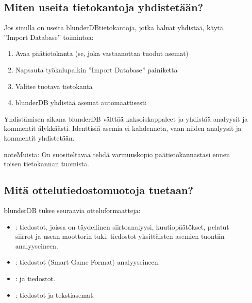 \documentclass[letterpaper,10pt,finnish]{sphinxmanual}
\begin{document}
\subsection{Miten useita tietokantoja yhdistetään?}
\label{\detokenize{faq:comment-fusionner-plusieurs-bases-de-donnees}}
\sphinxAtStartPar
Jos sinulla on useita blunderDB\sphinxhyphen{}tietokantoja, jotka haluat yhdistää, käytä ”Import Database” \sphinxhyphen{}toimintoa:
\begin{enumerate}
%
\item {} 
\sphinxAtStartPar
Avaa päätietokanta (se, joka vastaanottaa tuodut asemat)

\item {} 
\sphinxAtStartPar
Napsauta työkalupalkin ”Import Database” \sphinxhyphen{}painiketta

\item {} 
\sphinxAtStartPar
Valitse tuotava tietokanta

\item {} 
\sphinxAtStartPar
blunderDB yhdistää asemat automaattisesti

\end{enumerate}

\sphinxAtStartPar
Yhdistämisen aikana blunderDB välttää kaksoiskappaleet ja yhdistää analyysit ja kommentit älykkäästi. Identtisiä asemia ei kahdenneta, vaan niiden analyysit ja kommentit yhdistetään.

\begin{sphinxadmonition}{note}{Muista:}
\sphinxAtStartPar
On suositeltavaa tehdä varmuuskopio päätietokannastasi ennen toisen tietokannan tuomista.
\end{sphinxadmonition}


\subsection{Mitä ottelutiedostomuotoja tuetaan?}
\label{\detokenize{faq:quels-formats-de-fichiers-de-match-sont-supportes}}
\sphinxAtStartPar
blunderDB tukee seuraavia otteluformaatteja:
\begin{itemize}
\item {} 
\sphinxAtStartPar
{}: \sphinxhyphen{}tiedostot, joissa on täydellinen siirtoanalyysi, kuutiopäätökset, pelatut siirrot ja usean moottorin tuki. \sphinxhyphen{}tiedostot yksittäisten asemien tuontiin analyyseineen.

\item {} 
\sphinxAtStartPar
{}: \sphinxhyphen{}tiedostot (Smart Game Format) analyyseineen.

\item {} 
\sphinxAtStartPar
{}: \sphinxhyphen{} ja \sphinxhyphen{}tiedostot.

\item {} 
\sphinxAtStartPar
{}: \sphinxhyphen{}tiedostot ja tekstiasemat.

\end{itemize}
\end{document}
